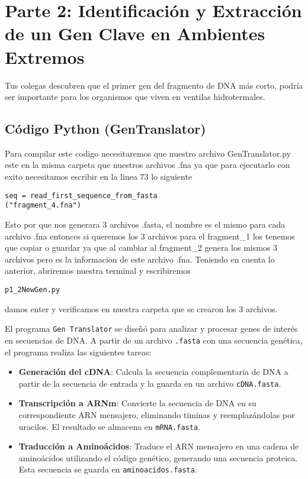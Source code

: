 \section*{Parte 2: Identificación y Extracción de un Gen Clave en Ambientes Extremos} 
\label{sec:parte2} %

Tus colegas descubren que el primer gen del fragmento de DNA más corto, podría ser importante para los organismos que viven en ventilas hidrotermales.

\subsection*{Código Python (GenTranslator)}

Para compilar este codigo necesitaremos que nuestro archivo GenTranslator.py este en la misma carpeta que nuestros archivos .fna ya que para ejecutarlo con exito necesitamos escribir en la linea 73 lo siguiente
\begin{verbatim}
seq = read_first_sequence_from_fasta
("fragment_4.fna")
\end{verbatim}
Esto por que nos generara 3 archivos .fasta, el nombre es el mismo para cada archivo .fna entonces si queremos los 3 archivos para el fragment\_1 los tenemos que copiar o guardar ya que al cambiar al fragment\_2 genera los mismos 3 archivos pero es la informacion de este archivo .fna.
Teniendo en cuenta lo anterior, abriremos nuestra terminal y escribiremos 
\begin{verbatim}
p1_2NewGen.py
\end{verbatim} 
damos enter y verificamos en nuestra carpeta que se crearon los 3 archivos.

El programa \texttt{Gen Translator} se diseñó para analizar y procesar genes de interés en secuencias de DNA. A partir de un archivo \texttt{.fasta} con una secuencia genética, el programa realiza las siguientes tareas:

\begin{itemize}
    \item \textbf{Generación del cDNA}: Calcula la secuencia complementaria de DNA a partir de la secuencia de entrada y la guarda en un archivo \texttt{cDNA.fasta}.
    \item \textbf{Transcripción a ARNm}: Convierte la secuencia de DNA en su correspondiente ARN mensajero, eliminando timinas y reemplazándolas por uracilos. El resultado se almacena en \texttt{mRNA.fasta}.
    \item \textbf{Traducción a Aminoácidos}: Traduce el ARN mensajero en una cadena de aminoácidos utilizando el código genético, generando una secuencia proteica. Esta secuencia se guarda en \texttt{aminoacidos.fasta}.
\end{itemize}

